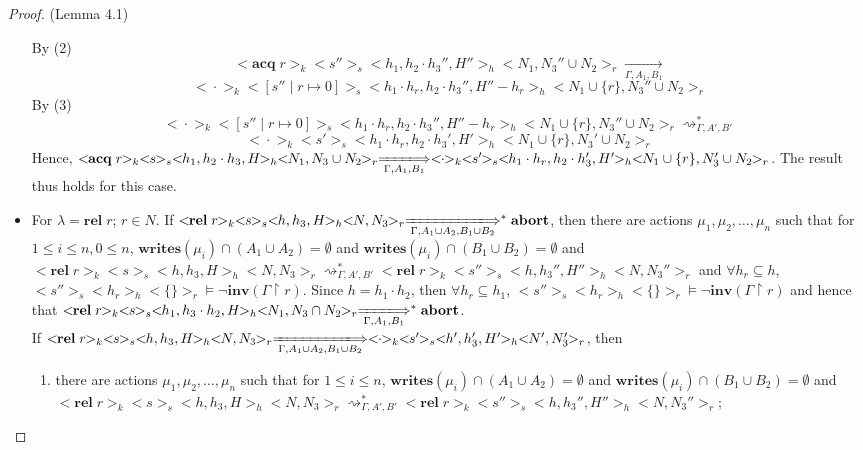 \documentclass{lmcs} %
\theoremstyle{plain}\newtheorem{satz}[thm]{Satz} %
\begin{document}
\begin{proof}{(Lemma 4.1)}
\begin{itemize}
 By (2)
  $$<\!\!\mathbf{acq}\;r\!\!>_k<\!\!s''\!\!>_s<\!\!h_1,h_2\cdot h_3'',H''\!\!>_h<\!\!N_1,N_3''\cup N_2\!\!>_r\xrightarrow[\Gamma, A_1,B_1]{}$$
  $$<\!\!\cdot\!\!>_k<\!\![s''\mid r\mapsto 0]\!\!>_s<\!\!h_1\cdot h_r,h_2\cdot h_3'',H''-h_r\!\!>_h<\!\!N_1\cup\{r\},N_3''\cup N_2\!\!>_r$$
  By (3)
  $$<\!\!\cdot\!\!>_k<\!\![s''\mid r\mapsto 0]\!\!>_s<\!\!h_1\cdot h_r,h_2\cdot h_3'',H''-h_r\!\!>_h<\!\!N_1\cup\{r\},N_3''\cup N_2\!\!>_r\rightsquigarrow_{\Gamma, A' ,B'}^*$$
  $$<\!\!\cdot\!\!>_k<\!\!s'\!\!>_s<\!\!h_1\cdot h_r,h_2\cdot h_3',H'\!\!>_h<\!\!N_1\cup\{r\},N_3'\cup N_2\!\!>_r$$
  Hence, $<\!\!\mathbf{acq}\;r\!\!>_k<\!\!s\!\!>_s<\!\!h_1,h_2\cdot h_3,H\!\!>_h<\!\!N_1,N_3\cup N_2\!\!>_r\xLongrightarrow[\Gamma, A_1, B_1]{}<\!\!\cdot\!\!>_k<\!\!s'\!\!>_s<\!\!h_1\cdot h_r,h_2\cdot h_3',H'\!\!>_h<\!\!N_1\cup\{r\},N_3'\cup N_2\!\!>_r$.
 The result thus holds for this case.
  \item For $\lambda=\mathbf{rel}\;r$; $r\in N$. If $<\!\!\mathbf{rel}\;r\!\!>_k<\!\!s\!\!>_s<\!\!h,h_3,H\!\!>_h<\!\!N,N_3\!\!>_r\xLongrightarrow[\Gamma, A_1\cup A_2,B_1\cup B_2]{}^*\mathbf{abort}$, then there are actions $\mu_1,\mu_2,\ldots,\mu_n$ such that for $1\leq i\leq n, 0\leq n$, $\mathbf{writes}(\mu_i)\cap (A_1\cup A_2) =\emptyset$ and $\mathbf{writes}(\mu_i)\cap (B_1\cup B_2) =\emptyset$ and
  $<\!\!\mathbf{rel}\;r\!\!>_k<\!\!s\!\!>_s<\!\!h,h_3,H\!\!>_h<\!\!N,N_3\!\!>_r\rightsquigarrow_{\Gamma, A' ,B'}^*<\!\!\mathbf{rel}\;r\!\!>_k<\!\!s''\!\!>_s<\!\!h,h_3'',H''\!\!>_h<\!\!N,N_3''\!\!>_r$ and $\forall h_r\subseteq h$, $<\!\!s''\!\!>_s<\!\!h_r\!\!>_h<\!\!\{\}\!\!>_r \models \neg\mathbf{inv}(\Gamma\upharpoonright r)$.
  Since $h=h_1\cdot h_2$, then $\forall h_r\subseteq h_1$, $<\!\!s''\!\!>_s<\!\!h_r\!\!>_h<\!\!\{\}\!\!>_r \models \neg\mathbf{inv}(\Gamma\upharpoonright r)$ and hence that
      $<\!\!\mathbf{rel}\;r\!\!>_k<\!\!s\!\!>_s<\!\!h_1,h_3\cdot h_2,H\!\!>_h<\!\!N_1,N_3\cap N_2\!\!>_r\xLongrightarrow[\Gamma, A_1,B_1]{}^*\mathbf{abort}$. \\
  If $<\!\!\mathbf{rel}\;r\!\!>_k<\!\!s\!\!>_s<\!\!h,h_3,H\!\!>_h<\!\!N,N_3\!\!>_r\xLongrightarrow[\Gamma, A_1\cup A_2, B_1\cup B_2]{}<\!\!\cdot\!\!>_k<\!\!s'\!\!>_s<\!\!h',h_3',H'\!\!>_h<\!\!N',N_3'\!\!>_r$, then
      \begin{enumerate}
    \item there are actions $\mu_1,\mu_2,\ldots,\mu_n$ such that for $1\leq i\leq n$, $\mathbf{writes}(\mu_i)\cap (A_1\cup A_2) =\emptyset$ and $\mathbf{writes}(\mu_i)\cap (B_1\cup B_2) =\emptyset$ and
  $<\!\!\mathbf{rel}\;r\!\!>_k<\!\!s\!\!>_s<\!\!h,h_3,H\!\!>_h<\!\!N,N_3\!\!>_r\rightsquigarrow_{\Gamma, A' ,B'}^*<\!\!\mathbf{rel}\;r\!\!>_k<\!\!s''\!\!>_s<\!\!h,h_3'',H''\!\!>_h<\!\!N,N_3''\!\!>_r$;

\end{enumerate}
\end{itemize}
\end{proof}
\end{document}
